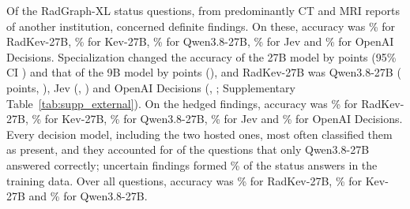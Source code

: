 Of the  RadGraph-XL status questions, from predominantly CT and MRI reports of another institution,  concerned definite findings. On these, accuracy was \% for RadKev-27B, \% for Kev-27B, \% for Qwen3.8-27B, \% for Jev and \% for OpenAI Decisions. Specialization changed the accuracy of the 27B model by  points (95\% CI ) and that of the 9B model by  points (), and RadKev-27B was  Qwen3.8-27B ( points, ),  Jev (, ) and  OpenAI Decisions (, ; Supplementary Table~\ref{tab:supp_external}). %
On the  hedged findings, accuracy was \% for RadKev-27B, \% for Kev-27B, \% for Qwen3.8-27B, \% for Jev and \% for OpenAI Decisions. Every decision model, including the two hosted ones, most often classified them as present, and they accounted for  of the  questions that only Qwen3.8-27B answered correctly; uncertain findings formed \% of the status answers in the training data. Over all  questions, accuracy was \% for RadKev-27B, \% for Kev-27B and \% for Qwen3.8-27B.
